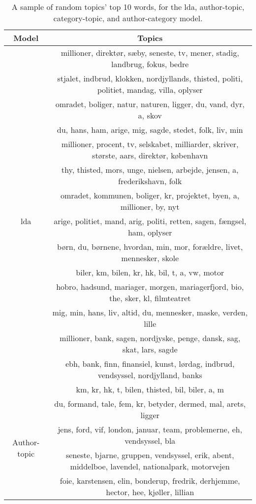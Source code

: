 \begin{table}
	\caption{A sample of random topics' top 10 words, for the \gls{lda}, author-topic, category-topic, and author-category model.}
	\label{tab:all_gibbs_topic_examples}
	\centering
	\begin{tabular}{c|c}
		Model & Topics \\
		\midrule
		\multirow{15}{*}{\gls{lda}} & millioner, direktør, sæby, seneste, tv, mener, stadig, landbrug, fokus, bedre \\
		& stjalet, indbrud, klokken, nordjyllands, thisted, politi, politiet, mandag, villa, oplyser \\
		& omradet, boliger, natur, naturen, ligger, du, vand, dyr, a, skov \\
		& du, hans, ham, arige, mig, sagde, stedet, folk, liv, min \\
		& millioner, procent, tv, selskabet, milliarder, skriver, største, aars, direktør, københavn \\
		& thy, thisted, mors, unge, nielsen, arbejde, jensen, a, frederikshavn, folk \\
		& omradet, kommunen, boliger, kr, projektet, byen, a, millioner, by, nyt \\
		& arige, politiet, mand, arig, politi, retten, sagen, fængsel, ham, oplyser \\
		& børn, du, børnene, hvordan, min, mor, forældre, livet, mennesker, skole \\
		& biler, km, bilen, kr, hk, bil, t, a, vw, motor \\
		& hobro, hadsund, mariager, morgen, mariagerfjord, bio, the, sker, kl, filmteatret \\
		& mig, min, hans, liv, altid, du, mennesker, maske, verden, lille \\
		& millioner, bank, sagen, nordjyske, penge, dansk, sag, skat, lars, sagde \\
		& ebh, bank, finn, finansiel, kunst, lørdag, indbrud, vendsyssel, nordjylland, banks \\
		& km, kr, hk, t, bilen, thisted, bil, biler, a, m \\
		\midrule
		\multirow{15}{*}{Author-topic} & du, formand, tale, fem, kr, betyder, dermed, mal, arets, ligger \\
		& jens, ford, vif, london, januar, team, problemerne, eh, vendsyssel, bla \\
		& seneste, bjarne, gruppen, vendsyssel, erik, abent, middelboe, lavendel, nationalpark, motorvejen \\
		& foie, karstensen, elin, bonderup, fredrik, derhjemme, hector, hee, kjøller, lillian \\

\end{tabular}
\end{table}
